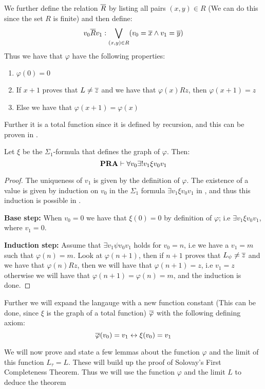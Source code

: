 \documentclass[../main.tex]{subfiles}
\begin{document}
We further define the relation $\overline R$ by listing all pairs $(x,y)\in R$ (We
can do this since the set $R$ is finite) and
then define:
\[v_0 \overline Rv_1: \bigvee_{(x,y)\in R}(v_0=\overline x\wedge v_1=\overline y) \]
Thus we have that $\varphi$ have the following properties:
\begin{enumerate}
	\item $\varphi(0)=0$
	\item If $x+1$ proves that $L\not =\overline z$ and we have that $\varphi(x)Rz$,
		then $\varphi(x+1)=z$
	\item Else we have that $\varphi(x+1)=\varphi(x)$
\end{enumerate}
Further it is a total function
since it is defined by recursion, and this can be proven in \PRA.
\begin{prop}
	Let $\xi$ be the $\Sigma_1$-formula that defines the graph of
	$\varphi$. Then:
	\[\text{\textbf{PRA}}\vdash\forall v_0\exists !v_1\xi v_0v_1\]
\end{prop}
\begin{proof}
	The uniqueness of $v_1$ is given by the definition of $\varphi$. The
	existence of a value is given by induction on $v_0$ in the $\Sigma_1$ formula $\exists
	v_1\xi v_0v_1$ in \PRA, and thus this induction is possible in \PRA. 

	\textbf{Base step:} When $v_0=0$ we have that $\xi(0)=0$ by
	definition of $\varphi$; i.e $\exists v_1\xi v_0v_1$, where $v_1=0$.

	\textbf{Induction step:} Assume that $\exists v_1\psi v_0v_1$ holds for
	$v_0=n$, i.e we have a $v_1=m$ such that $\varphi(n)=m$. Look at
	$\varphi(n+1)$, then if $n+1$ proves that $L_\psi\not =\overline z$ and we
	have that $\varphi(n)Rz$, then we will have that $\varphi(n+1)=z$, i.e
	$v_1=z$ otherwise we will have that $\varphi(n+1)=\varphi(n)=m$, and
	the induction is done.
\end{proof}
Further we will expand the langauge with a new function constant (This can be
done, since $\xi$ is the graph of a total function) $\overline \varphi$ with the following
defining axiom:
$$\overline \varphi(v_0)=v_1\leftrightarrow\xi (v_0)=v_1$$

We will now prove and state a few lemmas about the function $\varphi$ and the
limit of this function $L_\tau=L$. These will build up the proof of Solovay's
First Completeness Theorem. Thus we will use the function $\varphi$ and the
limit $L$ to deduce the theorem
\end{document}

